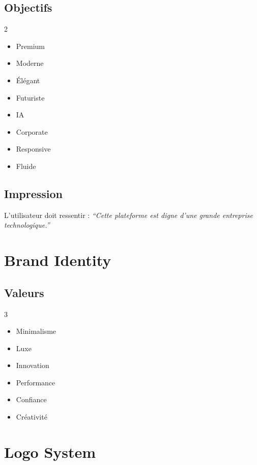 \documentclass[12pt,a4paper,oneside]{book}
\begin{document}
\section{Objectifs}
\begin{multicols}{2}
\begin{itemize}
\item Premium
\item Moderne
\item Élégant
\item Futuriste
\item IA
\item Corporate
\item Responsive
\item Fluide
\end{itemize}
\end{multicols}

\section{Impression}
L'utilisateur doit ressentir : \textit{``Cette plateforme est digne d'une grande entreprise technologique.''}

\chapter{Brand Identity}

\section{Valeurs}
\begin{multicols}{3}
\begin{itemize}
\item Minimalisme
\item Luxe
\item Innovation
\item Performance
\item Confiance
\item Créativité
\end{itemize}
\end{multicols}

\chapter{Logo System}
\end{document}
